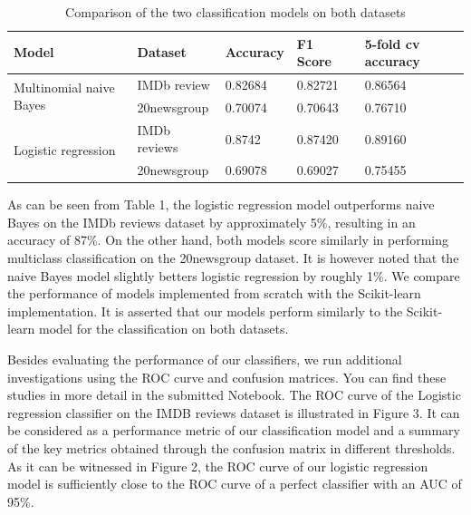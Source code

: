 \documentclass[10pt]{article}
\begin{document}
\begin{table}[h]
    \caption {Comparison of the two classification models on both datasets}
    \centering
    \begin{tabular}{|l|l|l|l|l|}
        \hline
        Model                                    & Dataset      & Accuracy & F1 Score~ & 5-fold cv accuracy  \\
        \hline
        \multirow{2}{*}{Multinomial naive Bayes} & IMDb review  & 0.82684 & 0.82721    & 0.86564                    \\
        \cline{2-5}
                                                 & 20newsgroup  &    0.70074     & 0.70643          & 0.76710                     \\
                                                 \hline
        \multirow{2}{*}{Logistic regression}     & IMDb reviews &     0.8742     &  0.87420         &         0.89160            \\
        \cline{2-5}
                                                 & 20newsgroup  &   0.69078       &  0.69027         & 0.75455                    \\
                                                 \hline
    \end{tabular}
\end{table}

As can be seen from Table 1, the logistic regression model outperforms naive Bayes on the IMDb reviews dataset by approximately 5\%, resulting in an accuracy of 87\%. On the other hand, both models score similarly in performing multiclass classification on the 20newsgroup dataset. It is however noted that the naive Bayes model slightly betters logistic regression by roughly 1\%. We compare the performance of models implemented from scratch with the Scikit-learn implementation. It is asserted that our models perform similarly to the Scikit-learn model for the classification on both datasets.

Besides evaluating the performance of our classifiers, we run additional investigations using the ROC curve and confusion matrices. You can find these studies in more detail in the submitted Notebook. The ROC curve of the Logistic regression classifier on the IMDB reviews dataset is illustrated in Figure 3. It can be considered as a performance metric of our classification model and a summary of the key metrics obtained through the confusion matrix in different thresholds. As it can be witnessed in Figure 2, the ROC curve of our logistic regression model is sufficiently close to the ROC curve of a perfect classifier with an AUC of 95\%.
\end{document}
